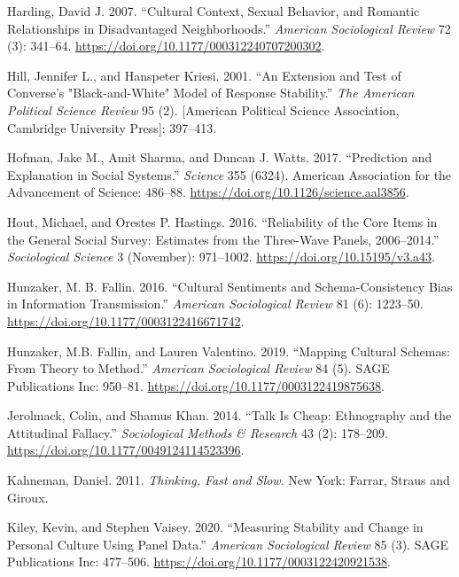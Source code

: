 \documentclass[12pt,]{article}
\begin{document}
\leavevmode\hypertarget{ref-harding2007}{}%
Harding, David J. 2007. ``Cultural Context, Sexual Behavior, and Romantic Relationships in Disadvantaged Neighborhoods.'' \emph{American Sociological Review} 72 (3): 341--64. \url{https://doi.org/10.1177/000312240707200302}.

\leavevmode\hypertarget{ref-hill2001a}{}%
Hill, Jennifer L., and Hanspeter Kriesi. 2001. ``An Extension and Test of Converse's "Black-and-White" Model of Response Stability.'' \emph{The American Political Science Review} 95 (2). {[}American Political Science Association, Cambridge University Press{]}: 397--413.

\leavevmode\hypertarget{ref-hofman2017}{}%
Hofman, Jake M., Amit Sharma, and Duncan J. Watts. 2017. ``Prediction and Explanation in Social Systems.'' \emph{Science} 355 (6324). American Association for the Advancement of Science: 486--88. \url{https://doi.org/10.1126/science.aal3856}.

\leavevmode\hypertarget{ref-hout2016}{}%
Hout, Michael, and Orestes P. Hastings. 2016. ``Reliability of the Core Items in the General Social Survey: Estimates from the Three-Wave Panels, 2006--2014.'' \emph{Sociological Science} 3 (November): 971--1002. \url{https://doi.org/10.15195/v3.a43}.

\leavevmode\hypertarget{ref-hunzaker2016}{}%
Hunzaker, M. B. Fallin. 2016. ``Cultural Sentiments and Schema-Consistency Bias in Information Transmission.'' \emph{American Sociological Review} 81 (6): 1223--50. \url{https://doi.org/10.1177/0003122416671742}.

\leavevmode\hypertarget{ref-hunzaker2019}{}%
Hunzaker, M.B. Fallin, and Lauren Valentino. 2019. ``Mapping Cultural Schemas: From Theory to Method.'' \emph{American Sociological Review} 84 (5). SAGE Publications Inc: 950--81. \url{https://doi.org/10.1177/0003122419875638}.

\leavevmode\hypertarget{ref-jerolmack2014}{}%
Jerolmack, Colin, and Shamus Khan. 2014. ``Talk Is Cheap: Ethnography and the Attitudinal Fallacy.'' \emph{Sociological Methods \& Research} 43 (2): 178--209. \url{https://doi.org/10.1177/0049124114523396}.

\leavevmode\hypertarget{ref-kahneman2011}{}%
Kahneman, Daniel. 2011. \emph{Thinking, Fast and Slow}. New York: Farrar, Straus and Giroux.

\leavevmode\hypertarget{ref-kiley2020}{}%
Kiley, Kevin, and Stephen Vaisey. 2020. ``Measuring Stability and Change in Personal Culture Using Panel Data.'' \emph{American Sociological Review} 85 (3). SAGE Publications Inc: 477--506. \url{https://doi.org/10.1177/0003122420921538}.
\end{document}
